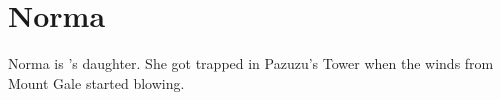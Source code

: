 \section{Norma}
\label{char:norma}


Norma is ’s daughter. She got trapped in Pazuzu’s Tower when the winds from Mount Gale started blowing.

